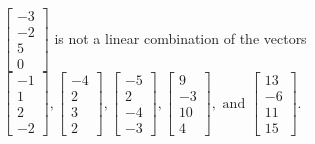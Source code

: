 \begin{exercise}
\begin{exerciseStatement}
  \end{exerciseStatement}
  \begin{exerciseAnswer}
   \(\left[\begin{array}{c}
-3 \\
-2 \\
5 \\
0
\end{array}\right]\) 
  	 is not  
	a linear combination of the vectors \(\left[\begin{array}{c}
-1 \\
1 \\
2 \\
-2
\end{array}\right] , \left[\begin{array}{c}
-4 \\
2 \\
3 \\
2
\end{array}\right] , \left[\begin{array}{c}
-5 \\
2 \\
-4 \\
-3
\end{array}\right] , \left[\begin{array}{c}
9 \\
-3 \\
10 \\
4
\end{array}\right] , \text{ and } \left[\begin{array}{c}
13 \\
-6 \\
11 \\
15
\end{array}\right]\).

	
  


  \end{exerciseAnswer}
\end{exercise}
